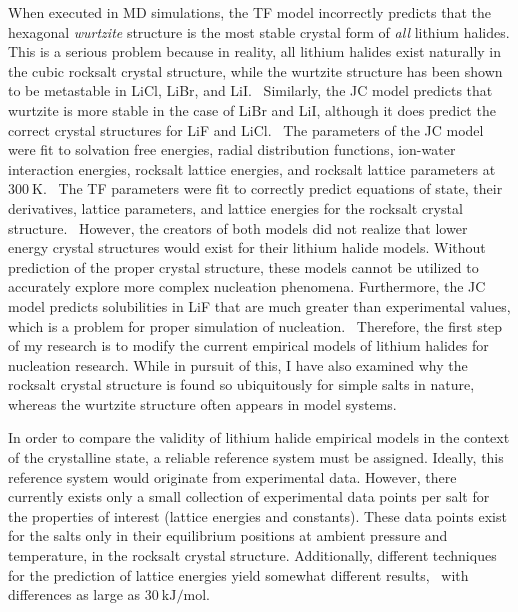 \documentclass[titlepage,11pt]{article}
\begin{document}
When executed in MD simulations, the TF model incorrectly predicts that the hexagonal \textit{wurtzite} structure is the most stable crystal form of \textit{all} lithium halides. This is a serious problem because in reality, all lithium halides exist naturally in the cubic rocksalt crystal structure, while the wurtzite structure has been shown to be metastable in LiCl, LiBr, and LiI.~\cite{bach2009synthesis,liebold2008experimental,fischer2004existiert} Similarly, the JC model predicts that wurtzite is more stable in the case of LiBr and LiI, although it does predict the correct crystal structures for LiF and LiCl.~\cite{Lanaro2017} The parameters of the JC model were fit to solvation free energies, radial distribution functions, ion-water interaction energies, rocksalt lattice energies, and rocksalt lattice parameters at $\SI{300}{\kelvin}$.~\cite{Joung2008} The TF parameters were fit to correctly predict equations of state, their derivatives, lattice parameters, and lattice energies for the rocksalt crystal structure.~\cite{Tosi1964,Fumi1964} However, the creators of both models did not realize that lower energy crystal structures would exist for their lithium halide models. Without prediction of the proper crystal structure, these models cannot be utilized to accurately explore more complex nucleation phenomena. Furthermore, the JC model predicts solubilities in LiF that are much greater than experimental values, which is a problem for proper simulation of nucleation.~\cite{Lanaro2018} Therefore, the first step of my research is to modify the current empirical models of lithium halides for nucleation research. While in pursuit of this, I have also examined why the rocksalt crystal structure is found so ubiquitously for simple salts in nature, whereas the wurtzite structure often appears in model systems.

In order to compare the validity of lithium halide empirical models in the context of the crystalline state, a reliable reference system must be assigned. Ideally, this reference system would originate from experimental data. However, there currently exists only a small collection of experimental data points per salt for the properties of interest (lattice energies and constants). These data points exist for the salts only in their equilibrium positions at ambient pressure and temperature, in the rocksalt crystal structure. Additionally, different techniques for the prediction of lattice energies yield somewhat different results,~\cite{Ladd1959,book:CRC,Joung2008,Huggins1937} with differences as large as $\SI{30}{\kilo\joule\per\mole}$. 
\end{document}
